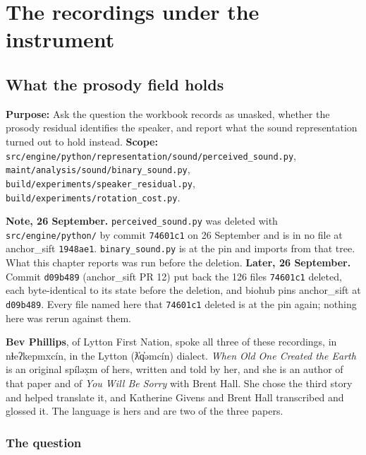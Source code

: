 \chapter{The recordings under the instrument}

\section{What the prosody field holds}

\textbf{Purpose:} Ask the question the workbook records as unasked, whether the prosody residual
identifies the speaker, and report what the sound representation turned out to hold instead.
\textbf{Scope:}
\texttt{src/\allowbreak{}engine/\allowbreak{}python/\allowbreak{}representation/\allowbreak{}sound/\allowbreak{}perceived\_\allowbreak{}sound.\allowbreak{}py},
\texttt{maint/\allowbreak{}analysis/\allowbreak{}sound/\allowbreak{}binary\_\allowbreak{}sound.\allowbreak{}py},
\texttt{build/\allowbreak{}experiments/\allowbreak{}speaker\_\allowbreak{}residual.\allowbreak{}py},
\texttt{build/\allowbreak{}experiments/\allowbreak{}rotation\_\allowbreak{}cost.\allowbreak{}py}.

\textbf{Note, 26 September.} \texttt{perceived\_\allowbreak{}sound.\allowbreak{}py} was deleted with
\texttt{src/\allowbreak{}engine/\allowbreak{}python/} by commit \texttt{74601c1} on 26 September and
is in no file at anchor\_sift \texttt{1948ae1}. \texttt{binary\_\allowbreak{}sound.\allowbreak{}py}
is at the pin and imports from that tree. What this chapter reports was run before the deletion.
\textbf{Later, 26 September.} Commit \texttt{d09b489} (anchor\_sift PR 12) put back the 126 files
\texttt{74601c1} deleted, each byte-identical to its state before the deletion, and biohub pins
anchor\_sift at \texttt{d09b489}. Every file named here that \texttt{74601c1} deleted is at the pin
again; nothing here was rerun against them.

\textbf{Bev Phillips}, of Lytton First Nation, spoke all three of these recordings, in
nɬeʔkepmxcín, in the Lytton (ƛ̓q̓əmcín) dialect. \emph{When Old One Created the Earth} is an
original spíləx̣m of hers, written and told by her, and she is an author of that paper and of
\emph{You Will Be Sorry} with Brent Hall. She chose the third story and helped translate it, and
Katherine Givens and Brent Hall transcribed and glossed it. The language is hers and are two of
the three papers.

\subsection{The question}

